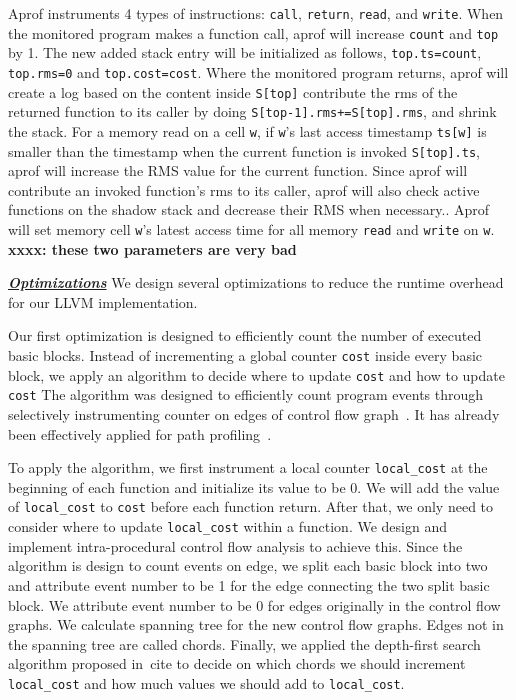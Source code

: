 {{{{Aprof instruments 4 types of instructions: \texttt{call}, 
\texttt{return}, \texttt{read}, and \texttt{write}. 
When the monitored program makes a function call,
aprof will increase \texttt{count} and \texttt{top} by 1.
The new added stack entry will be initialized as follows, 
\texttt{top.ts=count}, 
\texttt{top.rms=0} and \texttt{top.cost=cost}.  
Where the monitored program returns,
aprof will create a log based on the content inside \texttt{S[top]}
contribute the rms 
of the returned function to its caller by doing \texttt{S[top-1].rms+=S[top].rms},
and shrink the stack. 
For a memory read on a cell \texttt{w},
if \texttt{w}'s last access timestamp \texttt{ts[w]} is smaller 
than the timestamp when the current function is invoked \texttt{S[top].ts},
aprof will increase the RMS value for the current function.
Since aprof will contribute an invoked function's rms to its caller, 
aprof will also check active functions on the shadow stack and 
decrease their RMS when necessary..   
Aprof will set memory cell \texttt{w}'s latest access time 
for all memory \texttt{read} and \texttt{write} on \texttt{w}.
{\bf xxxx: these two parameters are very bad}

{{{\bf{\underline{\textit{Optimizations}}}}
We design several optimizations to reduce the 
runtime overhead for our LLVM implementation. 

Our first optimization is designed to efficiently count the number of executed basic blocks.
Instead of incrementing a global counter \texttt{cost} inside every basic block, 
we apply an algorithm to decide where to update \texttt{cost} and how to update \texttt{cost}  
The algorithm was designed to efficiently count program events through selectively instrumenting counter 
on edges of control flow graph~\cite{xx}. 
It has already been effectively applied for path profiling~\cite{xx}.

To apply the algorithm, we first instrument a local counter 
\texttt{local\_cost} at the beginning of each function
and initialize its value to be 0. 
We will add the value of \texttt{local\_cost} to \texttt{cost} before 
each function return.
After that, we only need to consider where to update \texttt{local\_cost} 
within a function.
We design and implement intra-procedural 
control flow analysis to achieve this.   
Since the algorithm is design to count events on edge,
we split each basic block into two and attribute event number to be 1 
for the edge connecting the two split basic block.  
We attribute event number to be 0 for edges originally in the control flow graphs. 
We calculate spanning tree for the new control flow graphs. 
Edges not in the spanning tree are called chords.
Finally, we applied the depth-first search algorithm proposed in~cite{} to decide
on which chords we should increment 
\texttt{local\_cost} and how much values we should add to \texttt{local\_cost}.
 

}}}}}}

